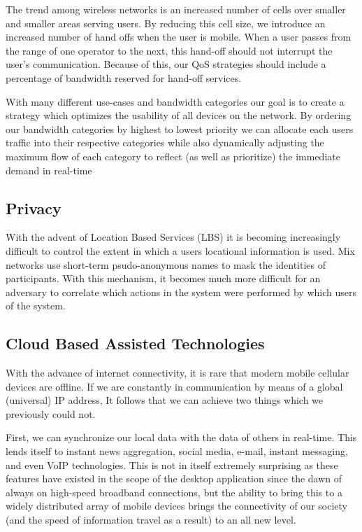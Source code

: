 \documentclass[final,a4paper,12pt]{report}
\begin{document}
The trend among wireless networks is an increased number of cells over smaller and smaller areas serving users. By reducing this cell size, we introduce an increased number of hand offs when the user is mobile. When a user passes from the range of one operator to the next, this hand-off should not interrupt the user's communication. Because of this, our QoS strategies should include a percentage of bandwidth reserved for hand-off services. 

With many different use-cases and bandwidth categories our goal is to create a strategy which optimizes the usability of all devices on the network. By ordering our bandwidth categories by highest to lowest priority we can allocate each users traffic into their respective categories while also dynamically adjusting the maximum flow of each category to reflect (as well as prioritize) the immediate demand in real-time
\cite{5710522}
\cite{1300874}
\cite{1376696}
\subsection{Privacy}
\cite{4698190}
\cite{4471983}

With the advent of Location Based Services (LBS) it is becoming increasingly difficult to control the extent in which a users locational information is used. Mix networks use short-term psudo-anonymous names to mask the identities of participants. With this mechanism, it becomes much more difficult for an adversary to correlate which actions in the system were performed by which users of the system.
\cite{6270872}
\cite{freudiger2007mix}
\cite{1032602}
\subsection{Cloud Based Assisted Technologies}

With the advance of internet connectivity, it is rare that modern mobile cellular devices are offline. If we are constantly in communication by means of a global (universal) IP address, It follows that we can achieve two things which we previously could not. 

First, we can synchronize our local data with the data of others in real-time. This lends itself to instant news aggregation, social media, e-mail, instant messaging, and even VoIP technologies. This is not in itself extremely surprising as these features have existed in the scope of the desktop application since the dawn of always on high-speed broadband connections, but the ability to bring this to a widely distributed array of mobile devices brings the connectivity of our society (and the speed of information travel as a result) to an all new level.
\end{document}
